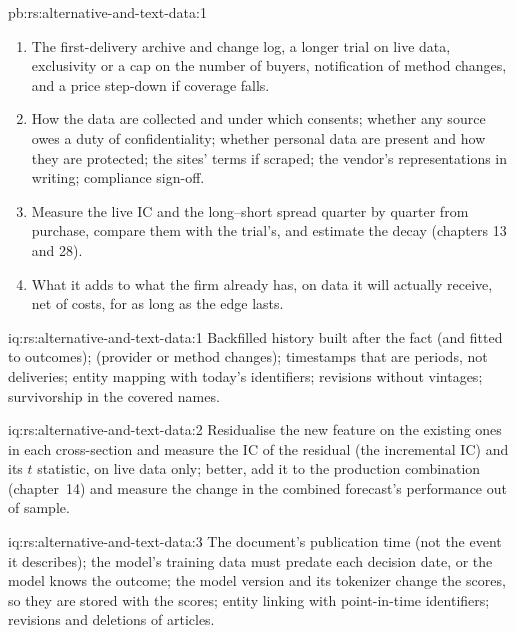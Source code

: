 \begin{solution}{pb:rs:alternative-and-text-data:1}
\begin{enumerate}
(break-even \$0.87 million at one year): the decision is a bet on the number of other buyers.
\item The first-delivery archive and change log, a longer trial on live data, exclusivity or a cap on the number of buyers, notification of method
changes, and a price step-down if coverage falls.
\item How the data are collected and under which consents; whether any source owes a duty of confidentiality; whether personal data are present
and how they are protected; the sites' terms if scraped; the vendor's representations in writing; compliance sign-off.
\item Measure the live IC and the long--short spread quarter by quarter from purchase, compare them with the trial's, and estimate the decay
(chapters 13 and 28).
\item What it adds to what the firm already has, on data it will actually receive, net of costs, for as long as the edge lasts.
\end{enumerate}
\end{solution}

\begin{solution}{iq:rs:alternative-and-text-data:1}
Backfilled history built after the fact (and fitted to outcomes);  (provider or method changes); timestamps that are periods, not
deliveries; entity mapping with today's identifiers; revisions without vintages; survivorship in the covered names.
\end{solution}

\begin{solution}{iq:rs:alternative-and-text-data:2}
Residualise the new feature on the existing ones in each cross-section and measure the IC of the residual (the incremental IC) and its $t$
statistic, on live data only; better, add it to the production combination (chapter~14) and measure the change in the combined forecast's
performance out of sample.
\end{solution}

\begin{solution}{iq:rs:alternative-and-text-data:3}
The document's publication time (not the event it describes); the model's training data must predate each decision date, or the model knows the
outcome; the model version and its tokenizer change the scores, so they are stored with the scores; entity linking with point-in-time
identifiers; revisions and deletions of articles.
\end{solution}

